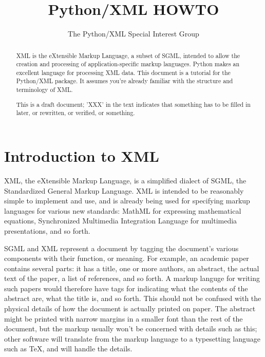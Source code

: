 \documentclass{howto}
\title{Python/XML HOWTO}
\author{The Python/XML Special Interest Group}
\begin{document}
\maketitle

\begin{abstract}
\noindent
XML is the eXtensible Markup Language, a subset of SGML, intended to
allow the creation and processing of application-specific markup
languages.  Python makes an excellent language for processing XML
data.  This document is a tutorial for the Python/XML package.  It
assumes you're already familiar with the structure and terminology of
XML.

This is a draft document; 'XXX' in the text indicates that something
has to be filled in later, or rewritten, or verified, or something.  
\end{abstract}

\tableofcontents

\section{Introduction to XML}

XML, the eXtensible Markup Language, is a simplified dialect of SGML,
the Standardized General Markup Language.  XML is intended to be
reasonably simple to implement and use, and is already being used for
specifying markup languages for various new standards: MathML for
expressing mathematical equations, Synchronized Multimedia
   Integration Language for
multimedia presentations, and so forth.

SGML and XML represent a document by tagging the document's various
components with their function, or meaning.  For example, an academic
paper contains several parts: it has a title, one or more authors, an
abstract, the actual text of the paper, a list of references, and so
forth.  A markup languge for writing such papers would therefore have
tags for indicating what the contents of the abstract are, what the
title is, and so forth.  This should not be confused with the physical
details of how the document is actually printed on paper.  The
abstract might be printed with narrow margins in a smaller font than
the rest of the document, but the markup usually won't be concerned
with details such as this; other software will translate from the
markup language to a typesetting language such as \TeX, and will
handle the details.
\end{document}
